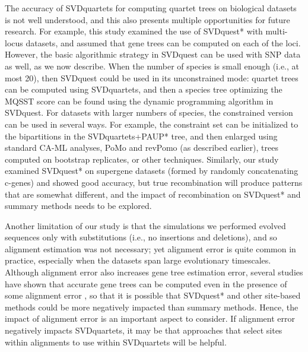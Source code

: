 The accuracy of SVDquartets for computing quartet trees on biological datasets is not well understood, and this also presents multiple opportunities for
future research.
For example,  this study examined the use of SVDquest* with multi-locus datasets, and  assumed that gene trees can be
computed on each of the loci. 
However, the basic algorithmic strategy  in SVDquest can be used with SNP data as well, as we now describe.
When the number of species is small enough (i.e., at most 20),  then SVDquest could be used in its unconstrained mode:  quartet trees can be computed using SVDquartets, and then a species tree 
optimizing the MQSST score can be found using the dynamic programming algorithm in SVDquest.
For datasets with larger numbers of species, the constrained version can be used in several ways.
For example,  the constraint set can be initialized to the bipartitions in the SVDquartets+PAUP* tree, and then enlarged using standard CA-ML analyses, PoMo and revPomo (as described
earlier), trees computed on bootstrap replicates, or other techniques.   
Similarly, our study examined SVDquest* on supergene datasets (formed by randomly concatenating c-genes) and showed good accuracy, but true recombination will produce patterns that are somewhat different, and the impact of
recombination on SVDquest* and summary methods needs to be explored.

  Another limitation of our study is that the simulations we performed evolved sequences only with substitutions (i.e., no insertions
 and deletions), and so alignment estimation was not necessary;  yet alignment
 error is quite common in practice, especially when the datasets span 
 large evolutionary timescales. 
 Although alignment error also increases gene tree estimation error, several studies have
shown that accurate gene trees can be computed even in the presence of
some alignment error \cite{sate2009}, so that it is possible that SVDquest* and other
site-based methods could be more negatively impacted than summary methods.
Hence, the impact of alignment error is an important aspect to consider.
 If alignment error negatively impacts SVDquartets, it may be that approaches that select sites within alignments to use within SVDquartets will be helpful.
  
